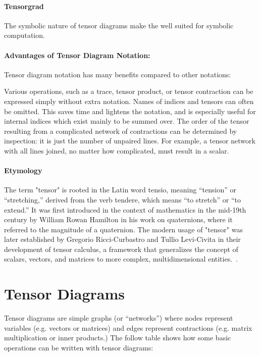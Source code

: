 \paragraph{Tensorgrad}
The symbolic nature of tensor diagrams make the well suited for symbolic computation.

\paragraph{Advantages of Tensor Diagram Notation:}
Tensor diagram notation has many benefits compared to other notations:

Various operations, such as a trace, tensor product, or tensor contraction can be expressed simply without extra notation.
Names of indices and tensors can often be omitted. This saves time and lightens the notation, and is especially useful for internal indices which exist mainly to be summed over.
The order of the tensor resulting from a complicated network of contractions can be determined by inspection: it is just the number of unpaired lines. For example, a tensor network with all lines joined, no matter how complicated, must result in a scalar.


\paragraph{Etymology}
The term "tensor" is rooted in the Latin word tensio, meaning ``tension'' or ``stretching,'' derived from the verb tendere, which means ``to stretch'' or ``to extend.''
It was first introduced in the context of mathematics in the mid-19th century by William Rowan Hamilton in his work on quaternions, where it referred to the magnitude of a quaternion.
The modern usage of "tensor" was later established by Gregorio Ricci-Curbastro and Tullio Levi-Civita in their development of tensor calculus, a framework that generalizes the concept of scalars, vectors, and matrices to more complex, multidimensional entities.~\cite{tensor_etymology_russo, hamilton_tensor}.


\tableofcontents
\clearpage


\section{Tensor Diagrams}
Tensor diagrams are simple graphs (or ``networks'') where
nodes represent variables (e.g. vectors or matrices) and edges represent
contractions (e.g. matrix multiplication or inner products.)
The follow table shows how some basic operations can be written with tensor diagrams:

